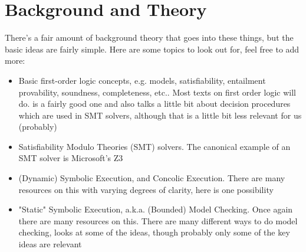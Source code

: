 \documentclass[11pt]{article}
\begin{document}
\section{Background and Theory}

There's a fair amount of background theory that goes into these things, but the
basic ideas are fairly simple. Here are some topics to look out for, feel free
to add more:

\begin{itemize}
\item
    Basic first-order logic concepts, e.g. models, satisfiability, entailment
    provability, soundness, completeness, etc.. Most texts on first order logic
    will do. \cite{COC} is a fairly good one and also talks a little bit about
    decision procedures which are used in SMT solvers, although that is a little
    bit less relevant for us (probably)
\item
    Satisfiability Modulo Theories (SMT) solvers. The canonical example of an
    SMT solver is Microsoft's Z3 \cite{Z3}
\item
    (Dynamic) Symbolic Execution, and Concolic Execution. There are many
    resources on this with varying degrees of clarity, here is one possibility
    \cite{SymEx}
\item
    "Static" Symbolic Execution, a.k.a. (Bounded) Model Checking. Once again
    there are many resources on this. There are many different ways to do
    model checking, \cite{LICS} looks at some of the ideas, though probably
    only some of the key ideas are relevant
\end{itemize}

\printbibheading
\printbibliography
\end{document}

